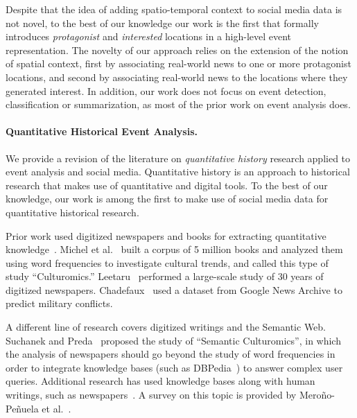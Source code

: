 
Despite that the idea of adding spatio-temporal context to social media data is
not novel, to the best of our knowledge our work is the first that formally
introduces {\em protagonist} and {\em interested} locations in a high-level
event representation.  
%
The novelty of our approach relies on the extension of the notion of spatial
context, first by associating real-world news to one or more protagonist
locations, and second by associating real-world news to the locations where they
generated interest.  
%
In addition, our work does not focus on event detection, classification or
summarization, as most of the prior work on event analysis does.

\paragraph{Quantitative Historical Event Analysis.}
We provide a revision of the literature on {\em quantitative history} research
applied to event analysis and social media. Quantitative history is an approach
to historical research that makes use of quantitative and digital
tools. 
%
To the best of our knowledge, our work is among the first to make use of social
media data for quantitative historical research.

Prior work used digitized newspapers and books for extracting quantitative
knowledge~\cite{Michel176,leetaru2011culturomics,chadefaux2014early}. 
%
Michel et al.~\cite{Michel176} built a corpus of 5 million books and analyzed
them using word frequencies to investigate cultural trends, and called this type
of study ``Culturomics.''
%
Leetaru~\cite{leetaru2011culturomics} performed a large-scale study of 30 years
of digitized newspapers.
%
Chadefaux~\cite{chadefaux2014early} used a dataset from Google News Archive to
predict military conflicts.

A different line of research covers digitized writings and the Semantic Web.
%
Suchanek and Preda~\cite{Suchanek:2014:SC:2732977.2732994} proposed the study of
``Semantic Culturomics'', in which the analysis of newspapers should go beyond
the study of word frequencies in order to integrate knowledge bases (such as
DBPedia~\cite{dbpedia}) to answer complex user queries. 
%
Additional research has used knowledge bases along with human writings, such as
newspapers~\cite{Huet:2013:MHL:2509558.2509567,DS/CN175}. 
%
A survey on this topic is provided by Mero\~no-Pe\~nuela et
al.~\cite{merono2014semantic}.

